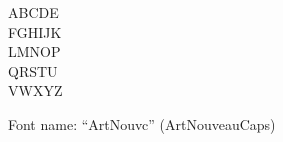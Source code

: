 \documentclass[a4paper]{article}
\begin{document}
\begin{center}
\fontsize{60pt}{72pt}
  ABCDE \\
  FGHIJK \\
  LMNOP \\
  QRSTU \\
  VWXYZ \\
\end{center}
\vfill
\begin{center}
Font name: ``ArtNouvc'' (ArtNouveauCaps)
\end{center}
\end{document}
